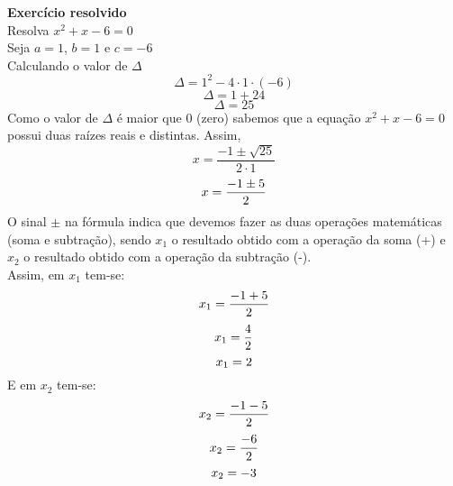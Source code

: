     \noindent
	\textbf{Exercício resolvido}\\
	Resolva $x^2+x-6=0$\\
	Seja $a=1$, $b=1$ e $c=-6$\\
	Calculando o valor de $\Delta$
	\[
	\Delta = 1^2 - 4 \cdot 1 \cdot (-6)
	\]
	\[
	\Delta = 1 + 24
	\]
	\[
	\Delta = 25
	\]
	Como o valor de $\Delta$ é maior que 0 (zero) sabemos que a equação $x^2+x-6=0$ possui duas raízes reais e distintas. Assim,
	\[
	x = \dfrac{-1 \pm \sqrt{25}}{2 \cdot 1}
	\]
	\[
	x = \dfrac{-1 \pm 5}{2}\\
	\]
	O sinal $\pm$ na fórmula indica que devemos fazer as duas operações matemáticas (soma e subtração), sendo  $x_1$ o resultado obtido com a operação da soma (+) e $x_2$ o resultado obtido com a operação da subtração (-).\\
	Assim, em $x_1$ tem-se:
	\[
	x_1 = \dfrac{-1 + 5}{2}\\
	\]
	\[
	x_1 = \dfrac{4}{2}\\
	\]
	\[
	x_1 = 2\\
	\]
	E em $x_2$ tem-se:
	\[
	x_2 = \dfrac{-1 - 5}{2}\\
	\]
	\[
	x_2 = \dfrac{-6}{2}\\
	\]
	\[
	x_2 = -3\\
	\]
	
